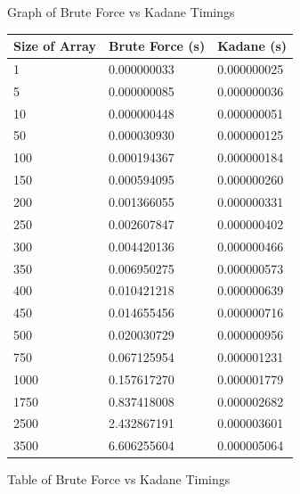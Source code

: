 \documentclass[10pt, letterpaper]{article}
\begin{document}
	\begin{figure}[!htb]
	\caption{
		\label{fig:time-graph} Graph of Brute Force vs Kadane Timings
	}
	\end{figure}

	
	\begin{figure}[!htb]
	\begin{center}
	\caption{
		\label{fig:time-table} Table of Brute Force vs Kadane Timings
	}
	\medskip
	\begin{tabular}{ | p{2cm} | l | l | }
			\hline
			Size of Array & Brute Force (s) & Kadane (s) \\ \hline
			1 & 0.000000033 & 0.000000025 \\ \hline
			5 & 0.000000085 & 0.000000036 \\ \hline
			10 & 0.000000448 & 0.000000051 \\ \hline
			50 & 0.000030930 & 0.000000125 \\ \hline
			100 & 0.000194367 & 0.000000184 \\ \hline
			150 & 0.000594095 & 0.000000260 \\ \hline
			200 & 0.001366055 & 0.000000331 \\ \hline
			250 & 0.002607847 & 0.000000402 \\ \hline
			300 & 0.004420136 & 0.000000466 \\ \hline
			350 & 0.006950275 & 0.000000573 \\ \hline
			400 & 0.010421218 & 0.000000639 \\ \hline
			450 & 0.014655456 & 0.000000716 \\ \hline
			500 & 0.020030729 & 0.000000956 \\ \hline
			750 & 0.067125954 & 0.000001231 \\ \hline
			1000 & 0.157617270 & 0.000001779 \\ \hline
			1750 & 0.837418008 & 0.000002682 \\ \hline
			2500 & 2.432867191 & 0.000003601 \\ \hline
			3500 & 6.606255604 & 0.000005064 \\ \hline
		\end{tabular}
	\end{center}
\end{figure}
\end{document}

